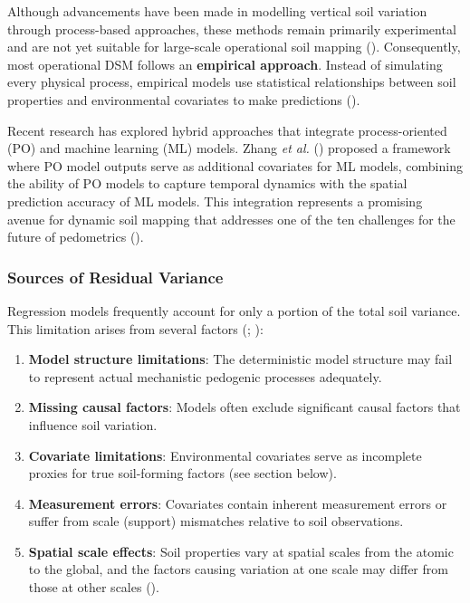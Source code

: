\documentclass[
  10pt,
  b5paper,
  oneside]{book}
\providecommand{\tightlist}{%
  \setlength{\itemsep}{0pt}\setlength{\parskip}{0pt}}
\begin{document}
Although advancements have been made in modelling vertical soil variation through process-based approaches, these methods remain primarily experimental and are not yet suitable for large-scale operational soil mapping (). Consequently, most operational DSM follows an \textbf{empirical approach}. Instead of simulating every physical process, empirical models use statistical relationships between soil properties and environmental covariates to make predictions ().

Recent research has explored hybrid approaches that integrate process-oriented (PO) and machine learning (ML) models. Zhang \emph{et al.} () proposed a framework where PO model outputs serve as additional covariates for ML models, combining the ability of PO models to capture temporal dynamics with the spatial prediction accuracy of ML models. This integration represents a promising avenue for dynamic soil mapping that addresses one of the ten challenges for the future of pedometrics ().

\subsubsection{Sources of Residual Variance}\label{sources-of-residual-variance}

Regression models frequently account for only a portion of the total soil variance. This limitation arises from several factors (; ):

\begin{enumerate}
\def\labelenumi{\arabic{enumi}.}
\tightlist
\item
  \textbf{Model structure limitations}: The deterministic model structure may fail to represent actual mechanistic pedogenic processes adequately.
\item
  \textbf{Missing causal factors}: Models often exclude significant causal factors that influence soil variation.
\item
  \textbf{Covariate limitations}: Environmental covariates serve as incomplete proxies for true soil-forming factors (see section below).
\item
  \textbf{Measurement errors}: Covariates contain inherent measurement errors or suffer from scale (support) mismatches relative to soil observations.
\item
  \textbf{Spatial scale effects}: Soil properties vary at spatial scales from the atomic to the global, and the factors causing variation at one scale may differ from those at other scales ().
\end{enumerate}
\end{document}
